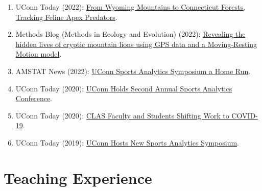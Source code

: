 \documentclass[Statistics]{vita}
\begin{document}
\begin{vita}
\begin{enumerate}
  \item UConn Today (2022): \href{https://today.uconn.edu/2022/10/from-wyoming-mountains-to-connecticut-forests-tracking-feline-apex-predators/}{From Wyoming Mountains to Connecticut Forests, Tracking Feline Apex Predators}.
  \item Methods Blog (Methods in Ecology and Evolution) (2022): \href{https://methodsblog.com/2022/01/21/revealing-the-hidden-lives-of-cryptic-mountain-lions-using-gps-data-and-a-moving-resting-motion-model/}{Revealing the hidden lives of cryptic mountain lions using GPS data and a Moving-Resting Motion model}.
  \item AMSTAT News (2022): \href{https://magazine.amstat.org/blog/2022/01/01/uconn-sports-analytics/}{UConn Sports Analytics Symposium a Home Run}.
  \item UConn Today (2020): \href{https://today.uconn.edu/2020/10/uconn-holds-second-annual-sports-analytics-conference/}{UConn Holds Second Annual Sports Analytics Conference}.
  \item UConn Today (2020):
\href{https://today.uconn.edu/2020/04/clas-faculty-students-shifting-work-covid-19/}{CLAS Faculty and Students Shifting Work to COVID-19}.
  \item UConn Today (2019): \href{https://today.uconn.edu/school-stories/uconn-hosts-new-sports-analytics-symposium/}{UConn Hosts New Sports Analytics Symposium}.
  \end{enumerate}
  \section{Teaching Experience}

\end{vita}
\end{document}
